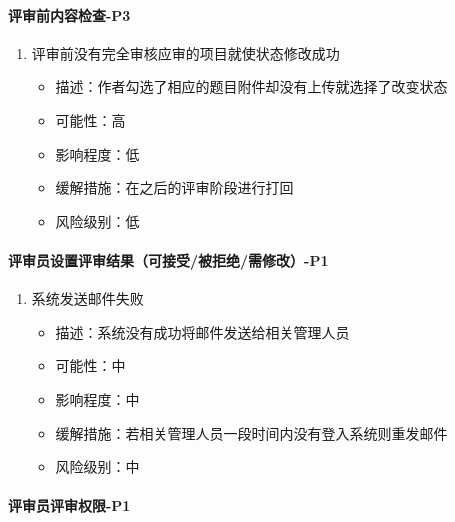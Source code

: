 \documentclass[hyperref, a4paper]{ctexart}
\providecommand{\tightlist}{%
  \setlength{\itemsep}{0pt}\setlength{\parskip}{0pt}}
\let\oldparagraph\paragraph
\renewcommand{\paragraph}[1]{\oldparagraph{#1}\mbox{}}
\begin{document}
\hypertarget{ux8bc4ux5ba1ux524dux5185ux5bb9ux68c0ux67e5-p3}{%
\paragraph{评审前内容检查-P3}\label{ux8bc4ux5ba1ux524dux5185ux5bb9ux68c0ux67e5-p3}}

\begin{enumerate}
\def\labelenumi{\arabic{enumi}.}
\tightlist
\item
  评审前没有完全审核应审的项目就使状态修改成功

  \begin{itemize}
  \tightlist
  \item
    描述：作者勾选了相应的题目附件却没有上传就选择了改变状态
  \item
    可能性：高
  \item
    影响程度：低
  \item
    缓解措施：在之后的评审阶段进行打回
  \item
    风险级别：低
  \end{itemize}
\end{enumerate}

\hypertarget{ux8bc4ux5ba1ux5458ux8bbeux7f6eux8bc4ux5ba1ux7ed3ux679cux53efux63a5ux53d7ux88abux62d2ux7eddux9700ux4feeux6539-p1}{%
\paragraph{评审员设置评审结果（可接受/被拒绝/需修改）-P1}\label{ux8bc4ux5ba1ux5458ux8bbeux7f6eux8bc4ux5ba1ux7ed3ux679cux53efux63a5ux53d7ux88abux62d2ux7eddux9700ux4feeux6539-p1}}

\begin{enumerate}
\def\labelenumi{\arabic{enumi}.}
\tightlist
\item
  系统发送邮件失败

  \begin{itemize}
  \tightlist
  \item
    描述：系统没有成功将邮件发送给相关管理人员
  \item
    可能性：中
  \item
    影响程度：中
  \item
    缓解措施：若相关管理人员一段时间内没有登入系统则重发邮件
  \item
    风险级别：中
  \end{itemize}
\end{enumerate}

\hypertarget{ux8bc4ux5ba1ux5458ux8bc4ux5ba1ux6743ux9650-p1}{%
\paragraph{评审员评审权限-P1}\label{ux8bc4ux5ba1ux5458ux8bc4ux5ba1ux6743ux9650-p1}}
\end{document}
